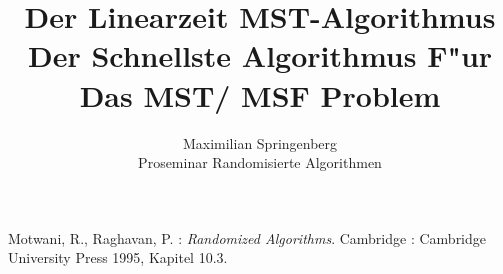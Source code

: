 \documentclass[a4paper,12pt,times,german]{cls/summary}
\title{Der Linearzeit MST-Algorithmus\\
       \LARGE Der Schnellste Algorithmus F"ur Das MST/ MSF Problem}
\author{Maximilian Springenberg\\
        \small Proseminar Randomisierte Algorithmen}
\date{}
\begin{document}
\maketitle







\begin{thebibliography}{}
\footnotesize
{} 
    Motwani, R., Raghavan, P. :
    \textit{Randomized Algorithms}. Cambridge :
    Cambridge University Press 1995, Kapitel 10.3.
\end{thebibliography}

\newpage

\end{document}
